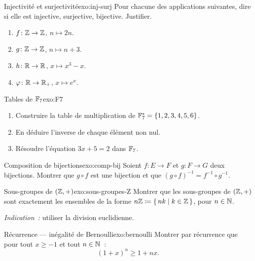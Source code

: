 \begin{exercise}{\basic{} Injectivité et surjectivité}{exo:inj-surj}
  Pour chacune des applications suivantes, dire si elle est injective,
  surjective, bijective. Justifier.
  \begin{enumerate}[label=(\alph*)]
    \item $f\colon{\mathbb{Z}}\to{\mathbb{Z}}$, $n\mapsto 2n$.
    \item $g\colon{\mathbb{Z}}\to{\mathbb{Z}}$, $n\mapsto n+3$.
    \item $h\colon{\mathbb{R}}\to{\mathbb{R}}$, $x\mapsto x^3-x$.
    \item $\varphi\colon{\mathbb{R}}\to{\mathbb{R}}_+$, $x\mapsto e^x$.
  \end{enumerate}
\end{exercise}

\begin{exercise}{\basic{} Tables de ${\mathbb{F}}_7$}{exo:F7}
  \begin{enumerate}[label=(\alph*)]
    \item Construire la table de multiplication de ${\mathbb{F}}_7^*=\left\{1,2,3,4,5,6\right\}$.
    \item En déduire l'inverse de chaque élément non nul.
    \item Résoudre l'équation $3x+5=2$ dans ${\mathbb{F}}_7$.
  \end{enumerate}
\end{exercise}

\begin{exercise}{\intermediate{} Composition de bijections}{exo:comp-bij}
  Soient $f\colon E\to F$ et $g\colon F\to G$ deux bijections. Montrer
  que $g\circ f$ est une bijection et que $(g\circ f)^{-1}=f^{-1}\circ g^{-1}$.
\end{exercise}

\begin{exercise}{\intermediate{} Sous-groupes de $({\mathbb{Z}},+)$}{exo:sous-groupes-Z}
  Montrer que les sous-groupes de $({\mathbb{Z}},+)$ sont exactement les ensembles
  de la forme $n{\mathbb{Z}}\coloneqq\left\{\,nk\;\middle|\;k\in{\mathbb{Z}}\,\right\}$, pour $n\in{\mathbb{N}}$.

  \emph{Indication~:} utiliser la division euclidienne.
\end{exercise}

\begin{exercise}{\intermediate{} Récurrence --- inégalité de Bernoulli}{exo:bernoulli}
  Montrer par récurrence que pour tout $x\geq -1$ et tout $n\in{\mathbb{N}}$~:
  \[
    (1+x)^n \geq 1+nx.
  \]
\end{exercise}

